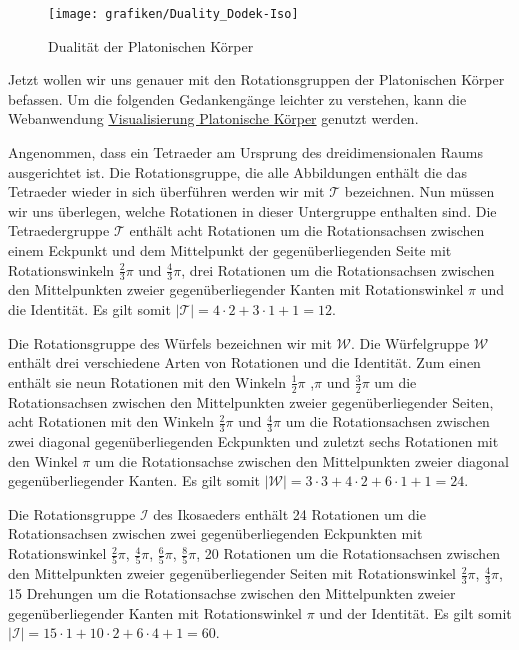 \begin{figure}[H]
\centering
\texttt{[image: grafiken/Duality\_Dodek-Iso]}
\caption{Dualität der Platonischen Körper}
\label{fig:Duality_Dodek-Iso}
\end{figure}
Jetzt wollen wir uns genauer mit den Rotationsgruppen der Platonischen Körper befassen. Um die folgenden Gedankengänge leichter zu verstehen, kann die Webanwendung \href{http://www-stud.uni-due.de/~simibark/visualisierung-platonische-koerper}{Visualisierung Platonische Körper} genutzt werden.

Angenommen, dass ein Tetraeder am Ursprung des dreidimensionalen Raums ausgerichtet ist. Die Rotationsgruppe, die alle Abbildungen enthält die das Tetraeder wieder in sich überführen werden wir mit $\mathcal{T}$ bezeichnen. Nun müssen wir uns überlegen, welche Rotationen in dieser Untergruppe enthalten sind. Die Tetraedergruppe $\mathcal{T}$ enthält acht Rotationen um die Rotationsachsen zwischen einem Eckpunkt und dem Mittelpunkt der gegenüberliegenden Seite mit Rotationswinkeln $\frac{2}{3}\pi$ und $\frac{4}{3}\pi$, drei Rotationen um die Rotationsachsen zwischen den Mittelpunkten zweier gegenüberliegender Kanten mit Rotationswinkel $\pi$ und die Identität. Es gilt somit $| \mathcal{T} | = 4 \cdot 2 + 3 \cdot 1 + 1 = 12$.

Die Rotationsgruppe des Würfels bezeichnen wir mit $\mathcal{W}$. Die Würfelgruppe $\mathcal{W}$ enthält drei verschiedene Arten von Rotationen und die Identität. Zum einen enthält sie neun Rotationen mit den Winkeln $\frac{1}{2}\pi$ ,$\pi$ und $\frac{3}{2}\pi$ um die Rotationsachsen zwischen den Mittelpunkten zweier gegenüberliegender Seiten, acht Rotationen mit den Winkeln $\frac{2}{3}\pi$ und $\frac{4}{3}\pi$ um die Rotationsachsen zwischen zwei diagonal gegenüberliegenden Eckpunkten und zuletzt sechs Rotationen mit den Winkel $\pi$ um die Rotationsachse zwischen den Mittelpunkten zweier diagonal gegenüberliegender Kanten. Es gilt somit $| \mathcal{W} | = 3 \cdot 3 + 4 \cdot 2 + 6 \cdot 1 + 1 = 24$.

Die Rotationsgruppe $\mathcal{I}$ des Ikosaeders enthält 24 Rotationen um die Rotationsachsen zwischen zwei gegenüberliegenden Eckpunkten mit Rotationswinkel $\frac{2}{5}\pi$, $\frac{4}{5}\pi$, $\frac{6}{5}\pi$, $\frac{8}{5}\pi$, 20 Rotationen um die Rotationsachsen zwischen den Mittelpunkten zweier gegenüberliegender Seiten mit Rotationswinkel $\frac{2}{3}\pi$, $\frac{4}{3}\pi$, 15 Drehungen um die Rotationsachse zwischen den Mittelpunkten zweier gegenüberliegender Kanten mit Rotationswinkel $\pi$ und der Identität. Es gilt somit $| \mathcal{I} | = 15 \cdot 1 + 10 \cdot 2 + 6 \cdot 4 + 1 = 60$.

